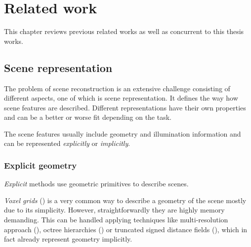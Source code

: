 \chapter{Related work}
\label{chap:related_work}


This chapter reviews previous related works as well as concurrent to this thesis works.




\section{Scene representation}

The problem of scene reconstruction is an extensive challenge consisting of different aspects,
one of which is scene representation.
It defines the way how scene features are described.
Different representations have their own properties and can be a better or worse fit depending on the task.

The scene features usually include geometry and illumination information
and can be represented \textit{explicitly} or \textit{implicitly}.

\subsection{Explicit geometry}

\textit{Explicit} methods use geometric primitives to describe scenes.

\textit{Voxel grids} (\cite{Lombardi_2019}) is a very common way to describe a geometry of the scene mostly due to its simplicity.
However, straightforwardly they are highly memory demanding.
This can be handled applying techniques like multi-resolution approach (\cite{häne2017hierarchical}), octree hierarchies (\cite{riegler2017octnet, tatarchenko2017octree})
or truncated signed distance fields (\cite{truncdistfield1996curless}),
which in fact already represent geometry implicitly.

